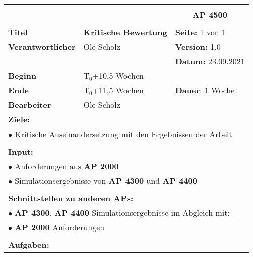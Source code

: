 \clearpage
\begin{table}[!h]
	\begin{center}
		\begin{tabular}{|p{35mm}||p{55mm}|p{50mm}||p{40mm}|}
			\hline
			\multicolumn{3}{|l||}{\textbf{}} & \multicolumn{1}{c|}{}\\
			\multicolumn{3}{|l||}{\textbf{}} & \multicolumn{1}{c|}{\textbf{AP 4500}}\\
			\multicolumn{3}{|l||}{\textbf{}} & \multicolumn{1}{c|}{}\\
			\hline\hline
			\textbf{Titel} & \multicolumn{2}{p{7cm}||}{\textbf{Kritische Bewertung}} 
			& \textbf{Seite:} 1 von 1\\
			\hline
			\textbf{Verantwortlicher} & \multicolumn{2}{l||}{Ole Scholz} & \textbf{Version:} 1.0\\
			\hline
			\multicolumn{3}{|l||}{} & \textbf{Datum:} 23.09.2021\\
			\hline\hline
			\textbf{Beginn} & \multicolumn{2}{l||}{T$_0$+10,5 Wochen} & \\
			\hline
			\textbf{Ende} & \multicolumn{2}{l||}{T$_0$+11,5 Wochen} & \textbf{Dauer}: 1 Woche\\
			\hline\hline
			\textbf{Bearbeiter} & \multicolumn{3}{l|}{Ole Scholz}\\
			\hline\hline
			\multicolumn{4}{|p{150mm}|}{\textbf{Ziele:}}\\
			\multicolumn{4}{|p{150mm}|}{$\bullet$ Kritische Auseinandersetzung mit den Ergebnissen der Arbeit}\\
			\multicolumn{4}{|p{150mm}|}{}\\
			\multicolumn{4}{|p{150mm}|}{\textbf{Input:}}\\
			\multicolumn{4}{|p{150mm}|}{$\bullet$ Anforderungen aus \textbf{AP 2000}}\\
			\multicolumn{4}{|p{150mm}|}{$\bullet$ Simulationsergebnisse von \textbf{AP 4300} und \textbf{AP 4400}}\\
			\multicolumn{4}{|p{150mm}|}{}\\
			\multicolumn{4}{|p{150mm}|}{\textbf{Schnittstellen zu anderen APs:}}\\
			\multicolumn{4}{|p{150mm}|}{$\bullet$ \textbf{AP 4300}, \textbf{AP 4400} Simulationsergebnisse im Abgleich mit: }\\
			\multicolumn{4}{|p{150mm}|}{$\bullet$ \textbf{AP 2000} Anforderungen}\\
			\multicolumn{4}{|p{150mm}|}{}\\
			\multicolumn{4}{|p{150mm}|}{\textbf{Aufgaben:}}\\

\end{tabular}
\end{center}
\end{table}
